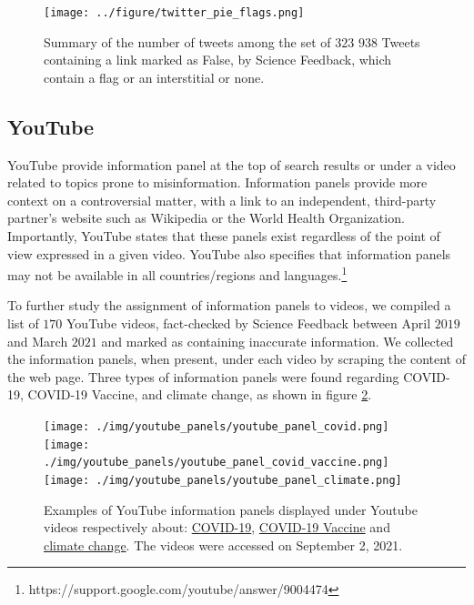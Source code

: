 \documentclass{article}
\begin{document}
\begin{figure}[h]
	\centering
	\texttt{[image: ../figure/twitter\_pie\_flags.png]}
	\caption{Summary of the number of tweets among the set of $323$ $938$ Tweets containing a link marked as False, by Science Feedback, which contain a flag or an interstitial or none.}
\label{flags_tab}
\end{figure}

\subsection{YouTube} \label{youtube_panels}

YouTube provide information panel at the top of search results or under a video related to topics prone to misinformation.
Information panels provide more context on a controversial matter, with a link to an independent, third-party partner's website such as Wikipedia or the World Health Organization. 
Importantly, YouTube states that these panels exist regardless of the point of view expressed in a given video.
YouTube also specifies that information panels may not be available in all countries/regions and languages.\footnote{https://support.google.com/youtube/answer/9004474}

\smallskip

To further study the assignment of information panels to videos, we compiled a list of $170$ YouTube videos, fact-checked by Science Feedback between April $2019$ and March $2021$ and marked as containing inaccurate information. 
We collected the information panels, when present, under each video by scraping the content of the web page. 
Three types of information panels were found regarding COVID-19, COVID-19 Vaccine, and climate change, as shown in figure \ref{youtube_panel_screenshots}.

\begin{figure}[h]
	\centering
		\texttt{[image: ./img/youtube\_panels/youtube\_panel\_covid.png]} 
		\texttt{[image: ./img/youtube\_panels/youtube\_panel\_covid\_vaccine.png]} 
		\texttt{[image: ./img/youtube\_panels/youtube\_panel\_climate.png]}
	\caption{Examples of YouTube information panels displayed under Youtube videos respectively about: \href{https://www.youtube.com/watch?v=O1cFVdC2rZQ}{COVID-19}, \href{https://www.youtube.com/watch?v=v0-6JTr2Ifo}{COVID-19 Vaccine} and \href{https://www.youtube.com/watch?v=4U8kgiiVj5Q}{climate change}. The videos were accessed on September 2, 2021.}
	\label{youtube_panel_screenshots}
\end{figure}
\end{document}
